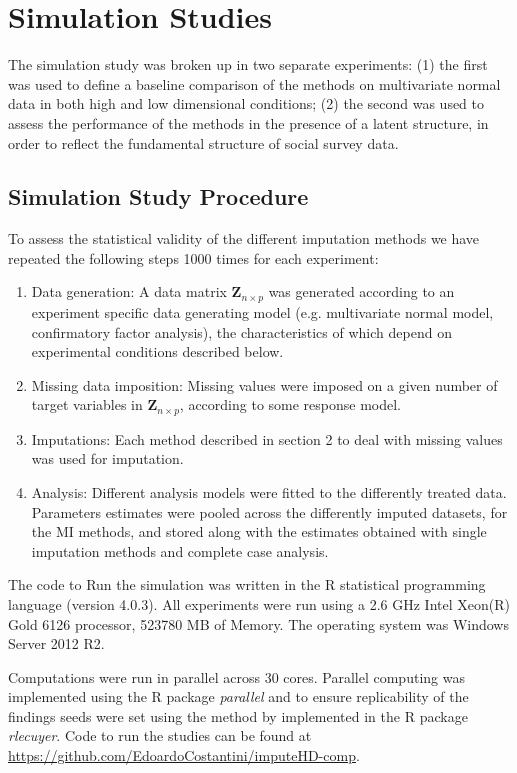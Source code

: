 \section{Simulation Studies}

The simulation study was broken up in two separate experiments: (1) the first was used to define a baseline comparison 
of the methods on multivariate normal data in both high and low dimensional conditions; (2) the second was used to 
assess the performance of the methods in the presence of a latent structure, in order to reflect the fundamental
structure of social survey data.

\subsection{Simulation Study Procedure}
	
	To assess the statistical validity of the different imputation methods we have repeated the following steps
	1000 times for each experiment:

	\begin{enumerate}
		\item Data generation: A data matrix $\bm{Z}_{n \times p}$ was generated according to an experiment 
			specific data generating model (e.g. multivariate normal model, confirmatory factor analysis),
			the characteristics of which depend on experimental conditions described below.
		\item Missing data imposition: Missing values were imposed on a given number of target variables
			in $\bm{Z}_{n \times p}$, according to some response model.
		\item Imputations: Each method described in section 2 to deal with missing values was used for 
			imputation.
		\item Analysis: Different analysis models were fitted to the differently treated data.
			Parameters estimates were pooled across the differently imputed datasets, for the MI methods,
			and stored along with the estimates obtained with single imputation methods and complete case 
			analysis.
	\end{enumerate}

	The code to Run the simulation was written in the R statistical programming language (version 4.0.3). 
	All experiments were run using a 2.6 GHz Intel Xeon(R) Gold 6126 processor, 523780 MB of Memory. The
	operating system was Windows Server 2012 R2.

	Computations were run in parallel across 30 cores. 
	Parallel computing was implemented using the R package \emph{parallel} and to ensure replicability 
	of the findings seeds were set using the method by \cite{lecuyer:2002} implemented in the R package 
	\emph{rlecuyer}.
	Code to run the studies can be found at \url{https://github.com/EdoardoCostantini/imputeHD-comp}.

